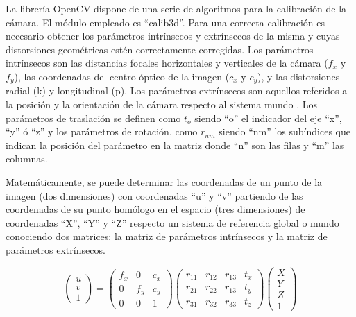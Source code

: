La librería OpenCV dispone de una serie de algoritmos para la calibración de la cámara. El módulo empleado es ``calib3d''. Para una correcta calibración es necesario obtener los parámetros intrínsecos y extrínsecos de la misma y cuyas distorsiones geométricas estén correctamente corregidas.
Los parámetros intrínsecos son las distancias focales horizontales y verticales de la cámara ($f_x$ y $f_y$), las coordenadas del centro óptico de la imagen ($c_x$ y $c_y$), y las distorsiones radial (k) y longitudinal (p). Los parámetros extrínsecos son aquellos referidos a la posición y la orientación de la cámara respecto al sistema mundo \citep{de2010deteccion}. Los parámetros de traslación se definen como $t_o$ siendo ``o'' el indicador del eje ``x'', ``y'' ó ``z'' y los parámetros de rotación, como $r_{nm}$ siendo ``nm'' los subíndices que indican la posición del parámetro en la matriz donde ``n'' son las filas y ``m'' las columnas.

Matemáticamente, se puede determinar las coordenadas de un punto de la imagen (dos dimensiones) con coordenadas ``u'' y ``v'' partiendo de las coordenadas de su punto homólogo en el espacio (tres dimensiones) de coordenadas ``X'', ``Y'' y ``Z'' respecto un sistema de referencia global o mundo conociendo dos matrices: la matriz de parámetros intrínsecos y la matriz de parámetros extrínsecos.

\begin{equation}
\begin{pmatrix}
u \\
v \\
1 
\end{pmatrix}
=
\begin{pmatrix}
f_x & 0 & c_x\\
0 & f_y & c_y\\
0 & 0 & 1 
\end{pmatrix}
\begin{pmatrix}
r_{11} & r_{12} & r_{13} & t_{x}\\
r_{21} & r_{22} & r_{13} & t_{y}\\
r_{31} & r_{32} & r_{33} & t_{z}
\end{pmatrix}
\begin{pmatrix}
X \\
Y \\
Z \\
1
\end{pmatrix}
\label{matriz}
\end{equation}






